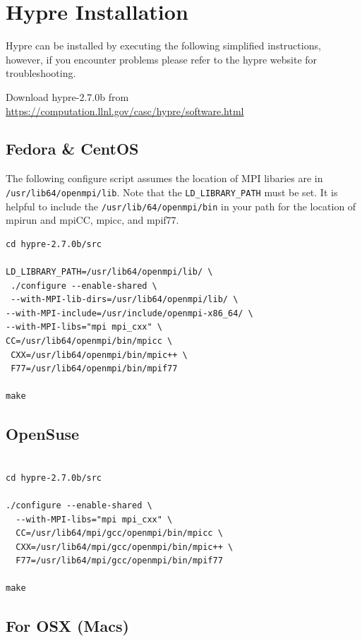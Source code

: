\documentclass[12pt]{article}
\begin{document}
\section{Hypre Installation}

Hypre can be installed by executing the following simplified
instructions, however, if you encounter problems please refer to the
hypre website for troubleshooting.

Download hypre-2.7.0b from
\url{https://computation.llnl.gov/casc/hypre/software.html}

\subsection{Fedora \& CentOS}

The following configure script assumes the location of MPI libaries
are in \texttt{/usr/lib64/openmpi/lib}.  Note that the
\texttt{LD\_LIBRARY\_PATH} must be set.  It is helpful to include the
\texttt{/usr/lib/64/openmpi/bin} in your path for the location of
mpirun and mpiCC, mpicc, and mpif77.


\begin{verbatim}
cd hypre-2.7.0b/src

LD_LIBRARY_PATH=/usr/lib64/openmpi/lib/ \
 ./configure --enable-shared \
 --with-MPI-lib-dirs=/usr/lib64/openmpi/lib/ \
--with-MPI-include=/usr/include/openmpi-x86_64/ \
--with-MPI-libs="mpi mpi_cxx" \
CC=/usr/lib64/openmpi/bin/mpicc \
 CXX=/usr/lib64/openmpi/bin/mpic++ \
 F77=/usr/lib64/openmpi/bin/mpif77

make

\end{verbatim}

\subsection{OpenSuse}

\begin{verbatim}

cd hypre-2.7.0b/src

./configure --enable-shared \
  --with-MPI-libs="mpi mpi_cxx" \
  CC=/usr/lib64/mpi/gcc/openmpi/bin/mpicc \
  CXX=/usr/lib64/mpi/gcc/openmpi/bin/mpic++ \
  F77=/usr/lib64/mpi/gcc/openmpi/bin/mpif77

make

\end{verbatim}

\subsection{For OSX (Macs)}
\end{document}
